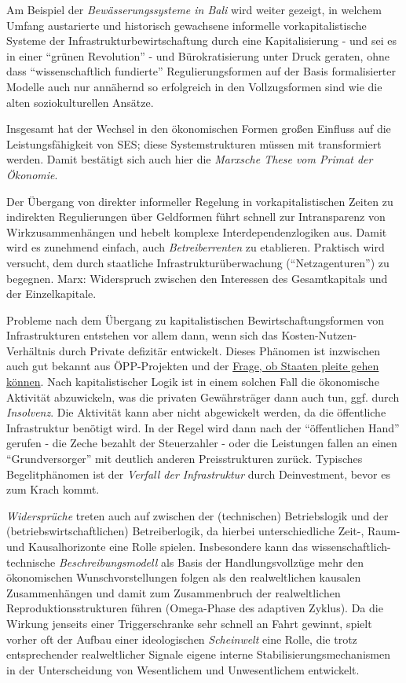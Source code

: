 \documentclass[11pt,a4paper]{article}
\begin{document}
Am Beispiel der \emph{Bewässerungssysteme in Bali} wird weiter gezeigt,
in welchem Umfang austarierte und historisch gewachsene informelle
vorkapitalistische Systeme der Infrastrukturbewirtschaftung durch eine
Kapitalisierung - und sei es in einer ``grünen Revolution'' - und
Bürokratisierung unter Druck geraten, ohne dass ``wissenschaftlich
fundierte'' Regulierungsformen auf der Basis formalisierter Modelle auch
nur annähernd so erfolgreich in den Vollzugsformen sind wie die alten
soziokulturellen Ansätze.

Insgesamt hat der Wechsel in den ökonomischen Formen großen Einfluss auf
die Leistungsfähigkeit von SES; diese Systemstrukturen müssen mit
transformiert werden. Damit bestätigt sich auch hier die \emph{Marxsche
These vom Primat der Ökonomie}.

Der Übergang von direkter informeller Regelung in vorkapitalistischen
Zeiten zu indirekten Regulierungen über Geldformen führt schnell zur
Intransparenz von Wirkzusammenhängen und hebelt komplexe
Interdependenzlogiken aus. Damit wird es zunehmend einfach, auch
\emph{Betreiberrenten} zu etablieren. Praktisch wird versucht, dem durch
staatliche Infrastrukturüberwachung (``Netzagenturen'') zu begegnen.
Marx: Widerspruch zwischen den Interessen des Gesamtkapitals und der
Einzelkapitale.

Probleme nach dem Übergang zu kapitalistischen Bewirtschaftungsformen
von Infrastrukturen entstehen vor allem dann, wenn sich das
Kosten-Nutzen-Verhältnis durch Private defizitär entwickelt. Dieses
Phänomen ist inzwischen auch gut bekannt aus ÖPP-Projekten und der
\href{https://de.wikipedia.org/wiki/Staatsbankrott}{Frage, ob Staaten
pleite gehen können}. Nach kapitalistischer Logik ist in einem solchen
Fall die ökonomische Aktivität abzuwickeln, was die privaten
Gewährsträger dann auch tun, ggf. durch \emph{Insolvenz}. Die Aktivität
kann aber nicht abgewickelt werden, da die öffentliche Infrastruktur
benötigt wird. In der Regel wird dann nach der ``öffentlichen Hand''
gerufen - die Zeche bezahlt der Steuerzahler - oder die Leistungen
fallen an einen ``Grundversorger'' mit deutlich anderen Preisstrukturen
zurück. Typisches Begelitphänomen ist der \emph{Verfall der
Infrastruktur} durch Deinvestment, bevor es zum Krach kommt.

\emph{Widersprüche} treten auch auf zwischen der (technischen)
Betriebslogik und der (betriebswirtschaftlichen) Betreiberlogik, da
hierbei unterschiedliche Zeit-, Raum- und Kausalhorizonte eine Rolle
spielen. Insbesondere kann das wissenschaftlich-technische
\emph{Beschreibungsmodell} als Basis der Handlungsvollzüge mehr den
ökonomischen Wunschvorstellungen folgen als den realweltlichen kausalen
Zusammenhängen und damit zum Zusammenbruch der realweltlichen
Reproduktionsstrukturen führen (Omega-Phase des adaptiven Zyklus). Da
die Wirkung jenseits einer Triggerschranke sehr schnell an Fahrt
gewinnt, spielt vorher oft der Aufbau einer ideologischen
\emph{Scheinwelt} eine Rolle, die trotz entsprechender realweltlicher
Signale eigene interne Stabilisierungsmechanismen in der Unterscheidung
von Wesentlichem und Unwesentlichem entwickelt.
\end{document}
